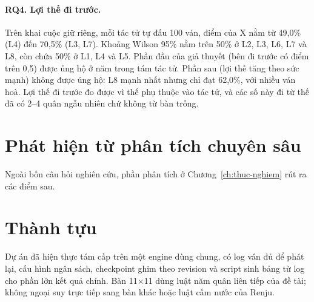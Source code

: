 \paragraph{RQ4. Lợi thế đi trước.}
Trên khai cuộc giữ riêng, mỗi tác tử tự đấu 100 ván, điểm của X nằm từ 49{,}0\% (L4) đến 70{,}5\% (L3, L7). Khoảng Wilson 95\% nằm trên 50\% ở L2, L3, L6, L7 và L8, còn chứa 50\% ở L1, L4 và L5. Phần đầu của giả thuyết (bên đi trước có điểm trên 0,5) được ủng hộ ở năm trong tám tác tử. Phần sau (lợi thế tăng theo sức mạnh) không được ủng hộ: L8 mạnh nhất nhưng chỉ đạt 62{,}0\%, với nhiều ván hoà. Lợi thế đi trước đo được vì thế phụ thuộc vào tác tử, và các số này đi từ thế đã có 2--4 quân ngẫu nhiên chứ không từ bàn trống.

\section{Phát hiện từ phân tích chuyên sâu}
Ngoài bốn câu hỏi nghiên cứu, phần phân tích ở Chương~\ref{ch:thuc-nghiem} rút ra các điểm sau.


\section{Thành tựu}
Dự án đã hiện thực tám cấp trên một engine dùng chung, có log ván đủ để phát lại, cấu hình ngân sách, checkpoint ghim theo revision và script sinh bảng từ log cho phần lớn kết quả chính. Bàn 11×11 dùng luật năm quân liên tiếp của đề tài; không ngoại suy trực tiếp sang bàn khác hoặc luật cấm nước của Renju.

